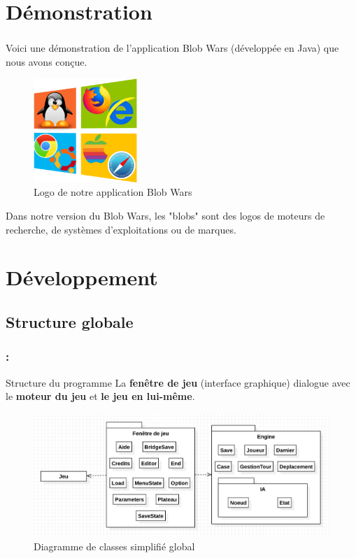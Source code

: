 \documentclass[9pt]{beamer}
\begin{document}
\section{Démonstration}

\begin{frame}
\frametitle{\insertsectionhead}

Voici une démonstration de l'application Blob Wars (développée en Java) que nous avons conçue.
\begin{figure}[h]
    \begin{center}
        \includegraphics[width=0.35\textwidth]{figures/icone.png}
        \caption{Logo de notre application Blob Wars}
    \end{center}
\end{figure}
Dans notre version du Blob Wars, les "blobs" sont des logos de moteurs de recherche, de systèmes d'exploitations ou de marques.
\end{frame}

\section{Développement}

\subsection{Structure globale}

\begin{frame}[fragile]
\frametitle{\insertsectionhead : \insertsubsectionhead}
\begin{block}{Structure du programme}
La \textbf{fenêtre de jeu} (interface graphique) dialogue avec le \textbf{moteur du jeu} et \textbf{le jeu en lui-même}.
\end{block}
\begin{figure}[h]
    \begin{center}
        \includegraphics[width=1\textwidth]{figures/UML/diagramme_simp.png}
        \caption{Diagramme de classes simplifié global}
    \end{center}
\end{figure}
\end{frame}
\end{document}
